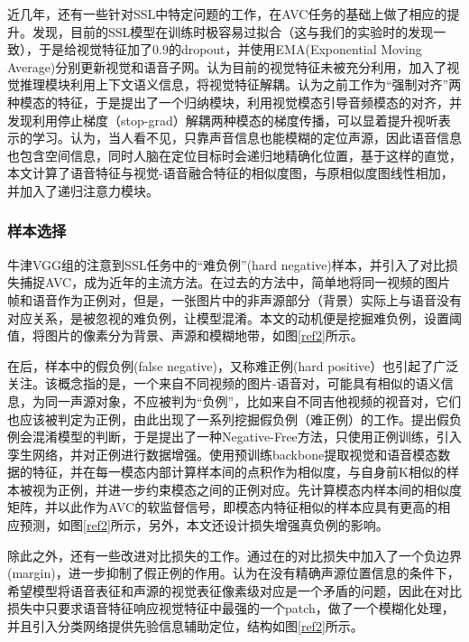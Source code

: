 \documentclass[12pt]{article}
\begin{document}
近几年，还有一些针对SSL中特定问题的工作，在AVC任务的基础上做了相应的提升。\cite{23}发现，目前的SSL模型在训练时极容易过拟合（这与我们的实验时的发现一致），于是给视觉特征加了0.9的dropout，并使用EMA(Exponential Moving Average)分别更新视觉和语音子网。\cite{23}认为目前的视觉特征未被充分利用，加入了视觉推理模块利用上下文语义信息，将视觉特征解耦。\cite{n2}认为之前工作为“强制对齐”两种模态的特征，于是提出了一个归纳模块，利用视觉模态引导音频模态的对齐，并发现利用停止梯度（stop-grad）解耦两种模态的梯度传播，可以显着提升视听表示的学习。\cite{n3}认为，当人看不见，只靠声音信息也能模糊的定位声源，因此语音信息也包含空间信息，同时人脑在定位目标时会递归地精确化位置，基于这样的直觉，本文计算了语音特征与视觉-语音融合特征的相似度图，与原相似度图线性相加，并加入了递归注意力模块。

\subsubsection{样本选择}
牛津VGG组的\cite{10}注意到SSL任务中的“难负例”(hard negative)样本，并引入了对比损失捕捉AVC，成为近年的主流方法。在过去的方法中，简单地将同一视频的图片帧和语音作为正例对，但是，一张图片中的非声源部分（背景）实际上与语音没有对应关系，是被忽视的难负例，让模型混淆。本文的动机便是挖掘难负例，设置阈值，将图片的像素分为背景、声源和模糊地带，如图\ref{ref2}所示。



在\cite{10}后，样本中的假负例(false negative)，又称难正例(hard positive）也引起了广泛关注。该概念指的是，一个来自不同视频的图片-语音对，可能具有相似的语义信息，为同一声源对象，不应被判为“负例”，比如来自不同吉他视频的视音对，它们也应该被判定为正例，由此出现了一系列挖掘假负例（难正例）的工作。\cite{18}提出假负例会混淆模型的判断，于是提出了一种Negative-Free方法，只使用正例训练，引入孪生网络，并对正例进行数据增强。\cite{24}使用预训练backbone提取视觉和语音模态数据的特征，并在每一模态内部计算样本间的点积作为相似度，与自身前K相似的样本被视为正例，并进一步约束模态之间的正例对应。\cite{30}先计算模态内样本间的相似度矩阵，并以此作为AVC的软监督信号，即模态内特征相似的样本应具有更高的相应预测，如图\ref{ref2}所示，另外，本文还设计损失增强真负例的影响。

除此之外，还有一些改进对比损失的工作。\cite{21}通过在\cite{10}的对比损失中加入了一个负边界(margin)，进一步抑制了假正例的作用。\cite{22}认为在没有精确声源位置信息的条件下，希望模型将语音表征和声源的视觉表征像素级对应是一个矛盾的问题，因此在对比损失中只要求语音特征响应视觉特征中最强的一个patch，做了一个模糊化处理，并且引入分类网络提供先验信息辅助定位，结构如图\ref{ref2}所示。
\end{document}
